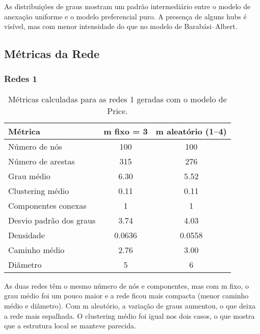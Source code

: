 \documentclass[a4paper]{article}
\begin{document}
As distribuições de graus mostram um padrão intermediário entre o modelo de anexação uniforme e o modelo preferencial puro. A presença de alguns hubs é visível, mas com menor intensidade do que no modelo de Barabási–Albert.

\subsection*{Métricas da Rede}

\subsubsection{Redes 1}

\begin{table}[h]
\centering
\begin{tabular}{|l|c|c|}
\hline
\textbf{Métrica} & \textbf{m fixo = 3} & \textbf{m aleatório (1–4)} \\
\hline
Número de nós & 100 & 100 \\
Número de arestas & 315 & 276 \\
Grau médio & 6.30 & 5.52 \\
Clustering médio & 0.11 & 0.11 \\
Componentes conexas & 1 & 1 \\
Desvio padrão dos graus & 3.74 & 4.03 \\
Densidade & 0.0636 & 0.0558 \\
Caminho médio & 2.76 & 3.00 \\
Diâmetro & 5 & 6 \\
\hline
\end{tabular}
\caption{Métricas calculadas para as redes 1 geradas com o modelo de Price.}
\end{table}

As duas redes têm o mesmo número de nós e componentes, mas com m fixo, o grau médio foi um pouco maior e a rede ficou mais compacta (menor caminho médio e diâmetro). Com m aleatório, a variação de graus aumentou, o que deixa a rede mais espalhada. O clustering médio foi igual nos dois casos, o que mostra que a estrutura local se manteve parecida.

\newpage 
\end{document}
